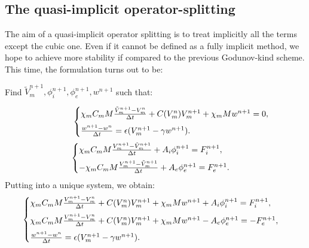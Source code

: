 \documentclass[a4paper,11pt]{article}
\begin{document}
\subsection{The quasi-implicit operator-splitting}
The aim of a quasi-implicit operator splitting is to treat implicitly all the terms except the cubic one. Even if it cannot be defined as a fully implicit method, we hope to achieve more stability if compared to the previous Godunov-kind scheme. This time, the formulation turns out to be: \newline

\begin{center} Find $\tilde{V}_m^{n+1}, \phi_i^{n+1}, \phi_e^{n+1},w^{n+1}$ such that: \end{center}
\begin{equation*} \hspace{17mm}
\begin{cases}
\chi_m C_m M \frac{\tilde{V}_m^{n+1}-V_m^n}{\Delta t} +  C(V_m^n) V_m^{n+1} + \chi_m M w^{n+1}= 0,\vspace{2mm}\\
\frac{w^{n+1} - w^n}{\Delta t} = \epsilon (V_m^{n+1}-\gamma w^{n+1}).
\end{cases}
\end{equation*}
\vspace{3mm}
\begin{equation*}
\begin{cases}
\chi_m C_m M \frac{V_m^{n+1}-\tilde{V}_m^{n+1}}{\Delta t} + A_i \phi_i^{n+1}= F_i^{n+1},\vspace{2mm}\\
- \chi_m C_m M \frac{V_m^{n+1}-\tilde{V}_m^{n+1}}{\Delta t} + A_e \phi_e^{n+1}= F_e^{n+1}.
\end{cases}
\end{equation*}
\vspace{3mm}
Putting into a unique system, we obtain:
\begin{equation}\label{Quasi}
\begin{cases}
\chi_m C_m M \frac{V_m^{n+1}-V_m^{n}}{\Delta t} + C(V_m^n) V_m^{n+1} + \chi_m M w^{n+1} + A_i \phi_i ^{n+1} = F_i^{n+1}, \vspace{2mm}\\
\chi_m C_m M \frac{V_m^{n+1}-V_m^{n}}{\Delta t} +  C(V_m^n) V_m^{n+1} + \chi_m M w^{n+1} - A_e \phi_e ^{n+1} =  -F_e^{n+1},\vspace{2mm} \\
\frac{w^{n+1}-w^{n}}{\Delta t} = \epsilon(V_m^{n+1}-\gamma w^{n+1}).
\end{cases}
\end{equation} 
\end{document}
